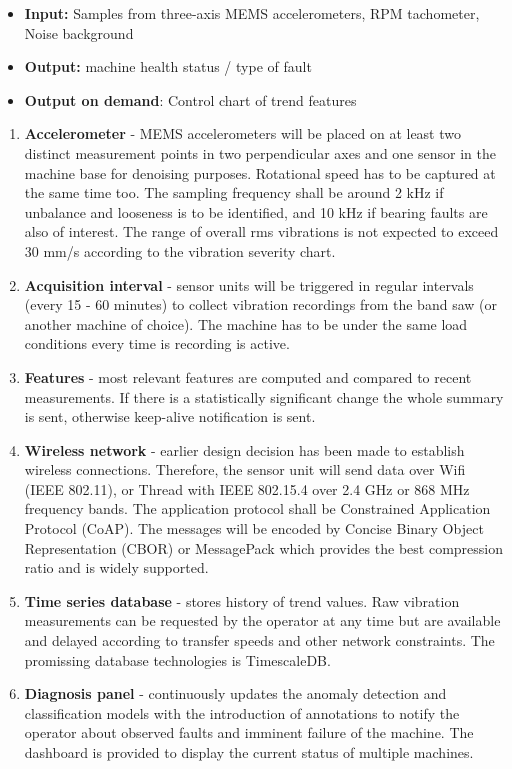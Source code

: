  \begin{itemize}
 \itemsep0pt
\item \textbf{Input:} Samples from three-axis MEMS accelerometers, RPM tachometer, Noise background
\item \textbf{Output:} machine health status / type of fault
\item \textbf{Output on demand}: Control chart of trend features
\end{itemize}

\begin{enumerate}
\itemsep0pt
\item \textbf{Accelerometer} - MEMS accelerometers will be placed on at least two distinct measurement points in two perpendicular axes and one sensor in the machine base for denoising purposes. Rotational speed has to be captured at the same time too. The sampling frequency shall be around 2 kHz if unbalance and looseness is to be identified, and 10 kHz if bearing faults are also of interest. The range of overall rms vibrations is not expected to exceed 30 mm/s according to the vibration severity chart.
\item \textbf{Acquisition interval} - sensor units will be triggered in regular intervals (every 15 - 60 minutes) to collect vibration recordings from the band saw (or another machine of choice). The machine has to be under the same load conditions every time is recording is active. 
\item \textbf{Features} - most relevant features are computed and compared to recent measurements. If there is a statistically significant change the whole summary is sent, otherwise keep-alive notification is sent. 
\item \textbf{Wireless network} - earlier design decision has been made to establish wireless connections. Therefore, the sensor unit will send data over Wifi (IEEE 802.11), or Thread with IEEE 802.15.4 over 2.4 GHz or 868 MHz frequency bands. The application protocol shall be Constrained Application Protocol (CoAP). The messages will be encoded by Concise Binary Object Representation (CBOR) or MessagePack which provides the best compression ratio and is widely supported.
\item \textbf{Time series database} - stores history of trend values. Raw vibration measurements can be requested by the operator at any time but are available and delayed according to transfer speeds and other network constraints. The promissing database technologies is TimescaleDB.
\item \textbf{Diagnosis panel} - continuously updates the anomaly detection and classification models with the introduction of annotations to notify the operator about observed faults and imminent failure of the machine. The dashboard is provided to display the current status of multiple machines.
\end{enumerate}

